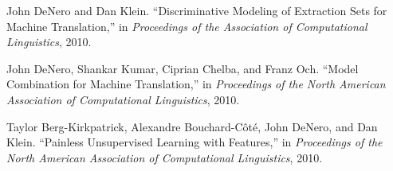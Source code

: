 \documentclass[margin,line]{res}
\begin{document}
\begin{resume}
John DeNero and Dan Klein. ``Discriminative Modeling of Extraction Sets for Machine Translation,'' in {\it Proceedings of the Association of Computational Linguistics}, 2010.

John DeNero, Shankar Kumar, Ciprian Chelba, and Franz Och. ``Model Combination for Machine Translation,'' in {\it Proceedings of the North American Association of Computational Linguistics}, 2010.

Taylor Berg-Kirkpatrick, Alexandre Bouchard-Côté, John DeNero, and Dan Klein. ``Painless Unsupervised Learning with Features,'' in {\it Proceedings of the North American Association of Computational Linguistics}, 2010.

\end{resume}
\end{document}
